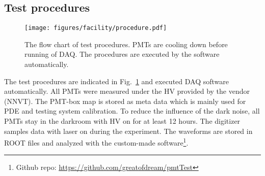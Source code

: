 \subsection{Test procedures}
\begin{figure}
    \centering
    \texttt{[image: figures/facility/procedure.pdf]}
    \caption{The flow chart of test procedures. PMTs are cooling down before running of DAQ. The procedures are executed by the software automatically.}
    \label{fig:testingprocedure}
\end{figure}

The test procedures are indicated in Fig.~\ref{fig:testingprocedure} and executed DAQ software automatically. All PMTs were measured under the HV provided by the vendor (NNVT). The PMT-box map is stored as meta data which is mainly used for PDE and testing system calibration. To reduce the influence of the dark noise, all PMTs stay in the darkroom with HV on for at least 12 hours. The digitizer samples data with laser on during the experiment. The waveforms are stored in ROOT files and analyzed with the custom-made software\footnote{Github repo: \url{https://github.com/greatofdream/pmtTest}}.
